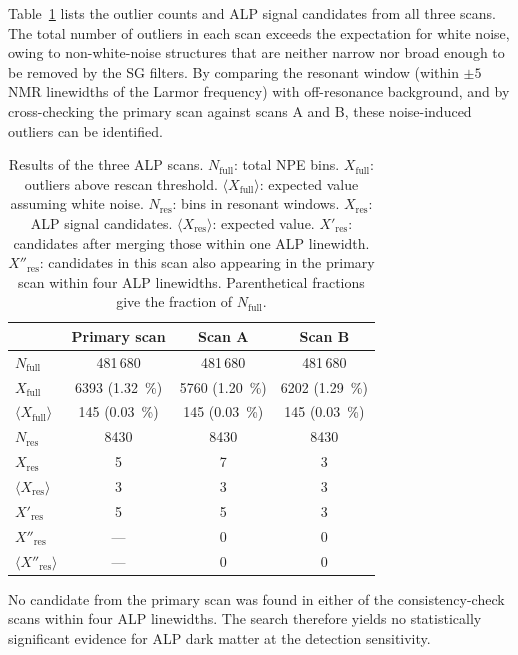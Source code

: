 Table~\ref{tab:candidates} lists the outlier counts and ALP signal candidates from all three scans. The total number of outliers in each scan exceeds the expectation for white noise, owing to non-white-noise structures that are neither narrow nor broad enough to be removed by the SG filters. By comparing the resonant window (within $\pm5$ NMR linewidths of the Larmor frequency) with off-resonance background, and by cross-checking the primary scan against scans A and B, these noise-induced outliers can be identified.

\begin{table}[htb]
    \centering
    \caption{Results of the three ALP scans. $N_\mathrm{full}$: total NPE bins. $X_\mathrm{full}$: outliers above rescan threshold. $\langle X_\mathrm{full}\rangle$: expected value assuming white noise. $N_\mathrm{res}$: bins in resonant windows. $X_\mathrm{res}$: ALP signal candidates. $\langle X_\mathrm{res}\rangle$: expected value. $X'_\mathrm{res}$: candidates after merging those within one ALP linewidth. $X''_\mathrm{res}$: candidates in this scan also appearing in the primary scan within four ALP linewidths. Parenthetical fractions give the fraction of $N_\mathrm{full}$.}
    \label{tab:candidates}
    \begin{tabular}{lccc}
        \hline\hline
        & Primary scan & Scan A & Scan B \\
        \hline
        $N_\mathrm{full}$ & 481\,680 & 481\,680 & 481\,680 \\
        $X_\mathrm{full}$ & 6393 (\SI{1.32}{\%}) & 5760 (\SI{1.20}{\%}) & 6202 (\SI{1.29}{\%}) \\
        $\langle X_\mathrm{full}\rangle$ & 145 (\SI{0.03}{\%}) & 145 (\SI{0.03}{\%}) & 145 (\SI{0.03}{\%}) \\
        \hline
        $N_\mathrm{res}$ & 8430 & 8430 & 8430 \\
        $X_\mathrm{res}$ & 5 & 7 & 3 \\
        $\langle X_\mathrm{res}\rangle$ & 3 & 3 & 3 \\
        $X'_\mathrm{res}$ & 5 & 5 & 3 \\
        $X''_\mathrm{res}$ & --- & 0 & 0 \\
        $\langle X''_\mathrm{res}\rangle$ & --- & 0 & 0 \\
        \hline\hline
    \end{tabular}
\end{table}

No candidate from the primary scan was found in either of the consistency-check scans within four ALP linewidths. The search therefore yields no statistically significant evidence for ALP dark matter at the detection sensitivity.

